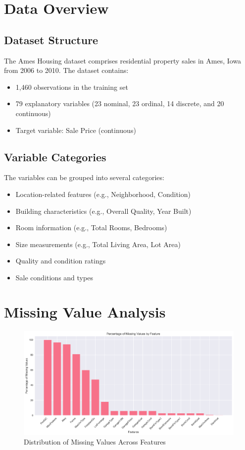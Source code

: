 \documentclass[12pt]{report}
\begin{document}
\section{Data Overview}
\subsection{Dataset Structure}
The Ames Housing dataset comprises residential property sales in Ames, Iowa from 2006 to 2010. The dataset contains:
\begin{itemize}
    \item 1,460 observations in the training set
    \item 79 explanatory variables (23 nominal, 23 ordinal, 14 discrete, and 20 continuous)
    \item Target variable: Sale Price (continuous)
\end{itemize}

\subsection{Variable Categories}
The variables can be grouped into several categories:
\begin{itemize}
    \item Location-related features (e.g., Neighborhood, Condition)
    \item Building characteristics (e.g., Overall Quality, Year Built)
    \item Room information (e.g., Total Rooms, Bedrooms)
    \item Size measurements (e.g., Total Living Area, Lot Area)
    \item Quality and condition ratings
    \item Sale conditions and types
\end{itemize}

\section{Missing Value Analysis}
\begin{figure}[H]
    \centering
    \includegraphics[width=1.0\textwidth]{figures/missing_values.png}
    \caption{Distribution of Missing Values Across Features}
    \label{fig:missing_values}
\end{figure}
\end{document}
